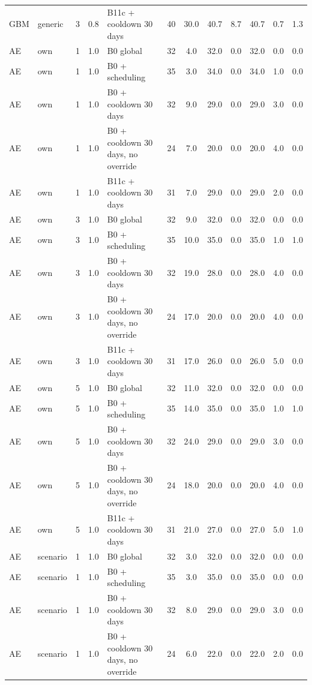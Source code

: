 \begin{longtable}{lllllccccccc}
GBM & generic & 3 & 0.8 & B11c + cooldown 30 days & 40 & 30.0 & 40.7 & 8.7 & 40.7 & 0.7 & 1.3 \\
AE & own & 1 & 1.0 & B0 global & 32 & 4.0 & 32.0 & 0.0 & 32.0 & 0.0 & 0.0 \\
AE & own & 1 & 1.0 & B0 + scheduling & 35 & 3.0 & 34.0 & 0.0 & 34.0 & 1.0 & 0.0 \\
AE & own & 1 & 1.0 & B0 + cooldown 30 days & 32 & 9.0 & 29.0 & 0.0 & 29.0 & 3.0 & 0.0 \\
AE & own & 1 & 1.0 & B0 + cooldown 30 days, no override & 24 & 7.0 & 20.0 & 0.0 & 20.0 & 4.0 & 0.0 \\
AE & own & 1 & 1.0 & B11c + cooldown 30 days & 31 & 7.0 & 29.0 & 0.0 & 29.0 & 2.0 & 0.0 \\
AE & own & 3 & 1.0 & B0 global & 32 & 9.0 & 32.0 & 0.0 & 32.0 & 0.0 & 0.0 \\
AE & own & 3 & 1.0 & B0 + scheduling & 35 & 10.0 & 35.0 & 0.0 & 35.0 & 1.0 & 1.0 \\
AE & own & 3 & 1.0 & B0 + cooldown 30 days & 32 & 19.0 & 28.0 & 0.0 & 28.0 & 4.0 & 0.0 \\
AE & own & 3 & 1.0 & B0 + cooldown 30 days, no override & 24 & 17.0 & 20.0 & 0.0 & 20.0 & 4.0 & 0.0 \\
AE & own & 3 & 1.0 & B11c + cooldown 30 days & 31 & 17.0 & 26.0 & 0.0 & 26.0 & 5.0 & 0.0 \\
AE & own & 5 & 1.0 & B0 global & 32 & 11.0 & 32.0 & 0.0 & 32.0 & 0.0 & 0.0 \\
AE & own & 5 & 1.0 & B0 + scheduling & 35 & 14.0 & 35.0 & 0.0 & 35.0 & 1.0 & 1.0 \\
AE & own & 5 & 1.0 & B0 + cooldown 30 days & 32 & 24.0 & 29.0 & 0.0 & 29.0 & 3.0 & 0.0 \\
AE & own & 5 & 1.0 & B0 + cooldown 30 days, no override & 24 & 18.0 & 20.0 & 0.0 & 20.0 & 4.0 & 0.0 \\
AE & own & 5 & 1.0 & B11c + cooldown 30 days & 31 & 21.0 & 27.0 & 0.0 & 27.0 & 5.0 & 1.0 \\
AE & scenario & 1 & 1.0 & B0 global & 32 & 3.0 & 32.0 & 0.0 & 32.0 & 0.0 & 0.0 \\
AE & scenario & 1 & 1.0 & B0 + scheduling & 35 & 3.0 & 35.0 & 0.0 & 35.0 & 0.0 & 0.0 \\
AE & scenario & 1 & 1.0 & B0 + cooldown 30 days & 32 & 8.0 & 29.0 & 0.0 & 29.0 & 3.0 & 0.0 \\
AE & scenario & 1 & 1.0 & B0 + cooldown 30 days, no override & 24 & 6.0 & 22.0 & 0.0 & 22.0 & 2.0 & 0.0 \\

\end{longtable}
